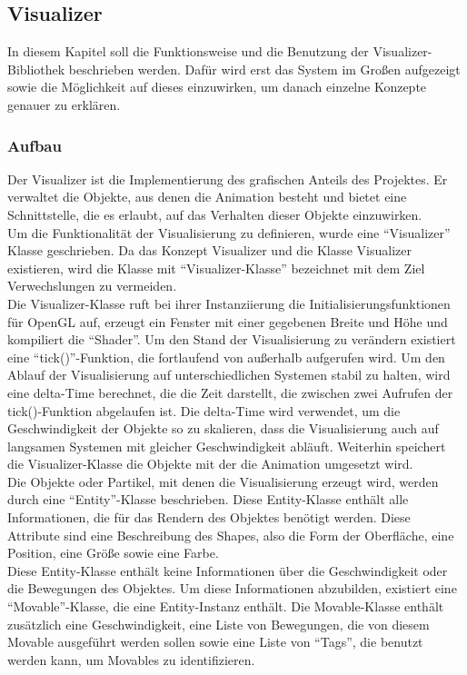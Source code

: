 \documentclass[11pt,a4paper]{article}
\begin{document}
\newpage
\subsection{Visualizer}
In diesem Kapitel soll die Funktionsweise und die Benutzung der Visualizer-Bibliothek beschrieben werden. Dafür wird erst das System im Großen aufgezeigt sowie die Möglichkeit auf dieses einzuwirken, um danach einzelne Konzepte genauer zu erklären.

\subsubsection{Aufbau}
Der Visualizer ist die Implementierung des grafischen Anteils des Projektes. Er verwaltet die Objekte, aus denen die Animation besteht und bietet eine Schnittstelle, die es erlaubt, auf das Verhalten dieser Objekte einzuwirken.\\
Um die Funktionalität der Visualisierung zu definieren, wurde eine ``Visualizer'' Klasse geschrieben. Da das Konzept Visualizer und die Klasse Visualizer existieren, wird die Klasse mit ``Visualizer-Klasse'' bezeichnet mit dem Ziel Verwechslungen zu vermeiden.\\
Die Visualizer-Klasse ruft bei ihrer Instanziierung die Initialisierungsfunktionen für OpenGL auf, erzeugt ein Fenster mit einer gegebenen Breite und Höhe und kompiliert die ``Shader''. Um den Stand der Visualisierung zu verändern existiert eine ``tick()''-Funktion, die fortlaufend von außerhalb aufgerufen wird. Um den Ablauf der Visualisierung auf unterschiedlichen Systemen stabil zu halten, wird eine delta-Time berechnet, die die Zeit darstellt, die zwischen zwei Aufrufen der tick()-Funktion abgelaufen ist. Die delta-Time wird verwendet, um die Geschwindigkeit der Objekte so zu skalieren, dass die Visualisierung auch auf langsamen Systemen mit gleicher Geschwindigkeit abläuft. Weiterhin speichert die Visualizer-Klasse die Objekte mit der die Animation umgesetzt wird.\\
Die Objekte oder Partikel, mit denen die Visualisierung erzeugt wird, werden durch eine ``Entity''-Klasse beschrieben. Diese Entity-Klasse enthält alle Informationen, die für das Rendern des Objektes benötigt werden. Diese Attribute sind eine Beschreibung des Shapes, also die Form der Oberfläche, eine Position, eine Größe sowie eine Farbe.\\
Diese Entity-Klasse enthält keine Informationen über die Geschwindigkeit oder die Bewegungen des Objektes. Um diese Informationen abzubilden, existiert eine ``Movable''-Klasse, die eine Entity-Instanz enthält. Die Movable-Klasse enthält zusätzlich eine Geschwindigkeit, eine Liste von Bewegungen, die von diesem Movable ausgeführt werden sollen sowie eine Liste von ``Tags'', die benutzt werden kann, um Movables zu identifizieren.\\
\end{document}

